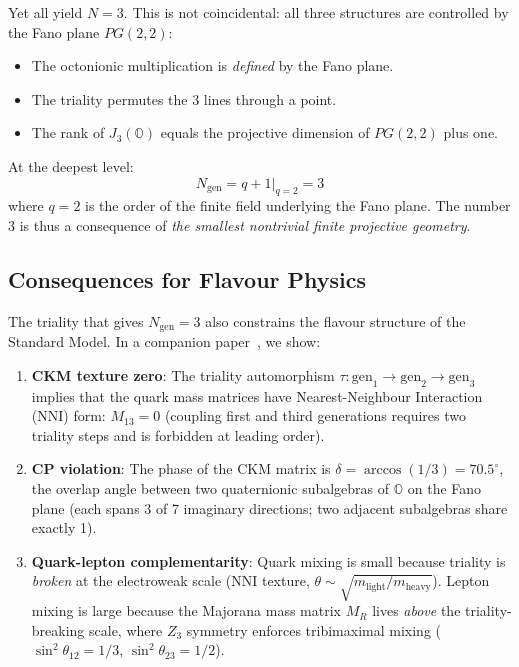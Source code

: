 \documentclass[12pt,a4paper]{article}
\theoremstyle{definition}
\theoremstyle{remark}
\newcommand{\Oct}{\mathbb{O}}
\begin{document}
Yet all yield $N = 3$. This is not coincidental: all three structures are 
controlled by the Fano plane $PG(2,2)$:
\begin{itemize}
\item The octonionic multiplication is \emph{defined} by the Fano plane.
\item The triality permutes the 3 lines through a point.
\item The rank of $J_3(\Oct)$ equals the projective dimension of $PG(2,2)$ plus one.
\end{itemize}

At the deepest level:
\begin{equation}
N_{\mathrm{gen}} = q + 1 \big|_{q=2} = 3
\end{equation}
where $q = 2$ is the order of the finite field underlying the Fano plane. The 
number 3 is thus a consequence of \emph{the smallest nontrivial finite projective 
geometry}.

\subsection{Consequences for Flavour Physics}

The triality that gives $N_{\mathrm{gen}} = 3$ also constrains the flavour 
structure of the Standard Model. In a companion paper~\cite{Paper2}, we show:

\begin{enumerate}
\item \textbf{CKM texture zero}: The triality automorphism 
$\tau: \mathrm{gen}_1 \to \mathrm{gen}_2 \to \mathrm{gen}_3$ implies that 
the quark mass matrices have Nearest-Neighbour Interaction (NNI) form: 
$M_{13} = 0$ (coupling first and third generations requires two triality 
steps and is forbidden at leading order).

\item \textbf{CP violation}: The phase of the CKM matrix is 
$\delta = \arccos(1/3) = 70.5^\circ$, the overlap angle between two 
quaternionic subalgebras of $\Oct$ on the Fano plane (each spans 3 of 7 
imaginary directions; two adjacent subalgebras share exactly 1).

\item \textbf{Quark-lepton complementarity}: Quark mixing is small because 
triality is \emph{broken} at the electroweak scale (NNI texture, 
$\theta \sim \sqrt{m_{\mathrm{light}}/m_{\mathrm{heavy}}}$). Lepton mixing 
is large because the Majorana mass matrix $M_R$ lives \emph{above} the 
triality-breaking scale, where $Z_3$ symmetry enforces tribimaximal mixing 
($\sin^2\theta_{12} = 1/3$, $\sin^2\theta_{23} = 1/2$).
\end{enumerate}
\end{document}
